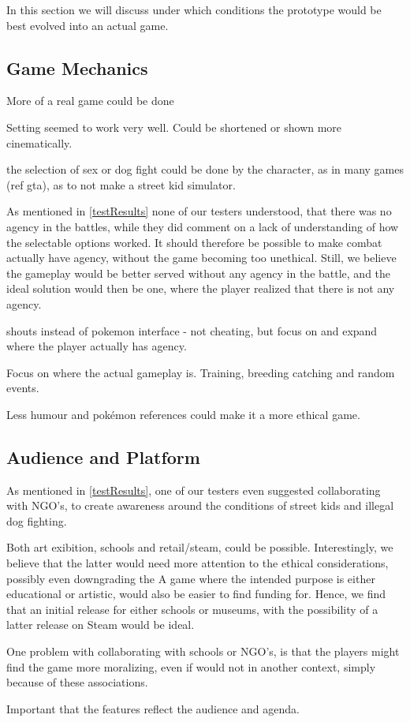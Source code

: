 In this section we will discuss under which conditions the prototype would be best evolved into an actual game.

\subsection{Game Mechanics}

More of a real game could be done

Setting seemed to work very well.  Could be shortened or shown more cinematically.

the selection of sex or dog fight could be done by the character, as in many games (ref gta), as to not make a street kid simulator.

As mentioned in \ref{testResults} none of our testers understood, that there was no agency in the battles, while they did comment on a lack of understanding of how the selectable options worked. It should therefore be possible to make combat actually have agency, without the game becoming too unethical. Still, we believe the gameplay would be better served without any agency in the battle, and the ideal solution would then be one, where the player realized that there is not any agency.

shouts instead of pokemon interface - not cheating, but focus on and expand where the player actually has agency.


Focus on where the actual gameplay is. Training, breeding catching and random events.




Less humour and pokémon references could make it a more ethical game.

\subsection{Audience and Platform}

As mentioned in \ref{testResults}, one of our testers even suggested collaborating with NGO's, to create awareness around the conditions of street kids and illegal dog fighting. 

Both art exibition, schools and retail/steam, could be possible. Interestingly, we believe that the latter would need more attention to the ethical considerations, possibly even downgrading the 
A game where the intended purpose is either educational or artistic, would also be easier to find funding for. 
Hence, we find that an initial release for either schools or museums, with the possibility of a latter release on Steam  would be ideal.

One problem with collaborating with schools or NGO's, is that the players might find the game more moralizing, even if would not in another context, simply because of these associations.

 Important that the features reflect the audience and agenda.